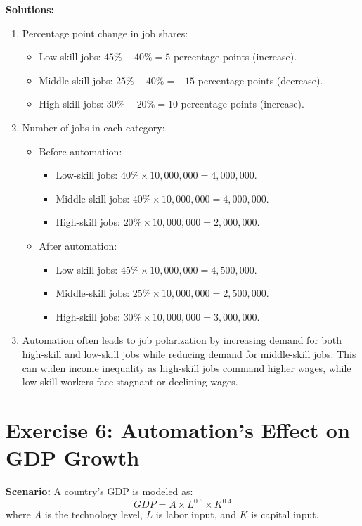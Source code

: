 \documentclass[12pt]{article}
\begin{document}
\textbf{Solutions:}
\begin{enumerate}
    \item Percentage point change in job shares:
    \begin{itemize}
        \item Low-skill jobs: $45\% - 40\% = 5$ percentage points (increase).
        \item Middle-skill jobs: $25\% - 40\% = -15$ percentage points (decrease).
        \item High-skill jobs: $30\% - 20\% = 10$ percentage points (increase).
    \end{itemize}
    \item Number of jobs in each category:
    \begin{itemize}
        \item Before automation:
        \begin{itemize}
            \item Low-skill jobs: $40\% \times 10,000,000 = 4,000,000$.
            \item Middle-skill jobs: $40\% \times 10,000,000 = 4,000,000$.
            \item High-skill jobs: $20\% \times 10,000,000 = 2,000,000$.
        \end{itemize}
        \item After automation:
        \begin{itemize}
            \item Low-skill jobs: $45\% \times 10,000,000 = 4,500,000$.
            \item Middle-skill jobs: $25\% \times 10,000,000 = 2,500,000$.
            \item High-skill jobs: $30\% \times 10,000,000 = 3,000,000$.
        \end{itemize}
    \end{itemize}
    \item Automation often leads to job polarization by increasing demand for both high-skill and low-skill jobs while reducing demand for middle-skill jobs. This can widen income inequality as high-skill jobs command higher wages, while low-skill workers face stagnant or declining wages.
\end{enumerate}

\section*{Exercise 6: Automation's Effect on GDP Growth}
\textbf{Scenario:} A country’s GDP is modeled as:
\[ GDP = A \times L^{0.6} \times K^{0.4} \]
where $A$ is the technology level, $L$ is labor input, and $K$ is capital input.
\end{document}
